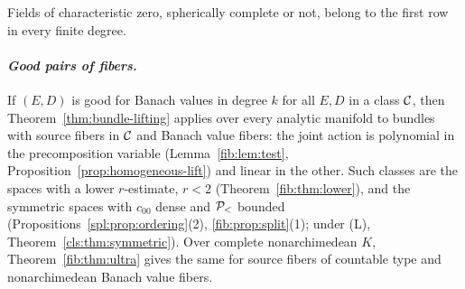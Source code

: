 Fields of characteristic zero, spherically complete or not, belong to the first row in every finite degree.

\paragraph{\textit{Good pairs of fibers.}}
If $(E,D)$ is good for Banach values in degree $k$ for all $E,D$ in a class $\mathcal{C}$, then Theorem~\ref{thm:bundle-lifting}
applies over every analytic manifold to bundles with source fibers in $\mathcal{C}$ and Banach value fibers: the joint action is
polynomial in the precomposition variable (Lemma~\ref{fib:lem:test}, Proposition~\ref{prop:homogeneous-lift}) and linear
in the other. Such classes are the spaces with a lower $r$-estimate, $r<2$ (Theorem~\ref{fib:thm:lower}), and the
symmetric spaces with $c_{00}$ dense and $\mathcal P_<$ bounded (Propositions~\ref{spl:prop:ordering}(2), \ref{fib:prop:split}(1);
under \textup{(L)}, Theorem~\ref{cls:thm:symmetric}). Over complete nonarchimedean $K$, Theorem~\ref{fib:thm:ultra} gives
the same for source fibers of countable type and nonarchimedean Banach value fibers.
